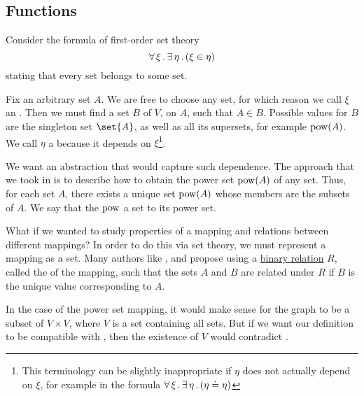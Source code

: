 \subsection{Functions}\label{subsec:functions}

\begin{remark}\label{rem:function_definition}
  Consider the formula of first-order set theory
  \begin{equation}\label{eq:rem:function_definition}
    \forall \thinspace \xi \thinspace . \thinspace \exists \thinspace \eta \thinspace . \thinspace (\xi \in \eta)
  \end{equation}
  stating that every set belongs to some set.

  Fix an arbitrary set \( A \). We are free to choose any set, for which reason we call \( \xi \) an . Then we must find a set \( B \) of \( V \),  on \( A \), such that \( A \in B \). Possible values for \( B \) are the singleton set \( \set{ A } \), as well as all its supersets, for example \( \operatorname{pow}(A) \). We call \( \eta \) a  because it depends on \( \xi \)\footnote{This terminology can be slightly inappropriate if \( \eta \) does not actually depend on \( \xi \), for example in the formula \( \forall \thinspace \xi \thinspace . \thinspace \exists \thinspace \eta \thinspace . \thinspace (\eta \doteq \eta) \)}.

  We want an abstraction that would capture such dependence. The approach that we took in  is to describe how to obtain the power set \( \operatorname{pow}(A) \) of any set. Thus, for each set \( A \), there exists a unique set \( \operatorname{pow}(A) \) whose members are the subsets of \( A \). We say that the  \( \operatorname{pow} \)  a set to its power set.

  What if we wanted to study properties of a mapping and relations between different mappings? In order to do this via set theory, we must represent a mapping as a set. Many authors like ,  and  propose using a \hyperref[def:binary_relation]{binary relation} \( R \), called the  of the mapping, such that the sets \( A \) and \( B \) are related under \( R \) if \( B \) is the unique value corresponding to \( A \).

  In the case of the power set mapping, it would make sense for the graph to be a subset of \( V \times V \), where \( V \) is a set containing all sets. But if we want our definition to be compatible with \hyperref[def:zfc]{}, then the existence of \( V \) would contradict .


\end{remark}

